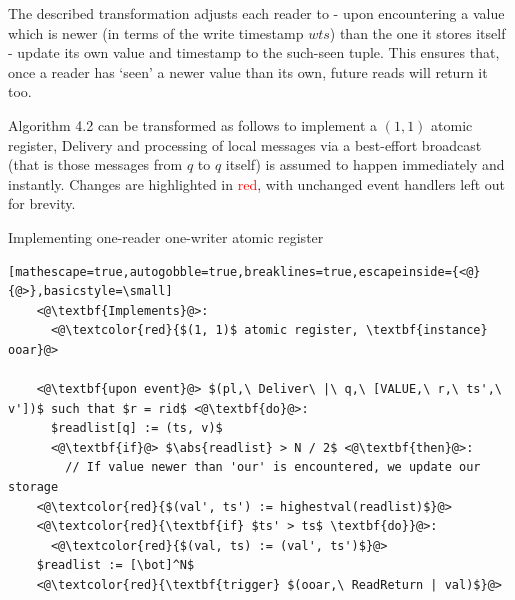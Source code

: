 \documentclass[a4paper]{scrreprt}
\DeclarePairedDelimiter\abs{\lvert}{\rvert}
\begin{document}
The described transformation adjusts each reader to - upon encountering a value
which is newer (in terms of the write timestamp $wts$) than the one it stores
itself - update its own value and timestamp to the such-seen tuple. This
ensures that, once a reader has `seen' a newer value than its own, future reads
will return it too.

Algorithm 4.2 can be transformed as follows to implement a $(1, 1)$ atomic
register, Delivery and processing of local messages via a best-effort broadcast
(that is those messages from $q$ to $q$ itself) is assumed to happen
immediately and instantly. Changes are highlighted in \textcolor{red}{red},
with unchanged event handlers left out for brevity.

\begin{library}{Implementing one-reader one-writer atomic register}
  \begin{lstlisting}[mathescape=true,autogobble=true,breaklines=true,escapeinside={<@}{@>},basicstyle=\small]
    <@\textbf{Implements}@>:
      <@\textcolor{red}{$(1, 1)$ atomic register, \textbf{instance} ooar}@>

    <@\textbf{upon event}@> $(pl,\ Deliver\ |\ q,\ [VALUE,\ r,\ ts',\ v'])$ such that $r = rid$ <@\textbf{do}@>:
      $readlist[q] := (ts, v)$
      <@\textbf{if}@> $\abs{readlist} > N / 2$ <@\textbf{then}@>:
        // If value newer than 'our' is encountered, we update our storage
	<@\textcolor{red}{$(val', ts') := highestval(readlist)$}@>
	<@\textcolor{red}{\textbf{if} $ts' > ts$ \textbf{do}}@>:
	  <@\textcolor{red}{$(val, ts) := (val', ts')$}@>
	$readlist := [\bot]^N$
	<@\textcolor{red}{\textbf{trigger} $(ooar,\ ReadReturn | val)$}@>
  \end{lstlisting}
\end{library}
\end{document}
